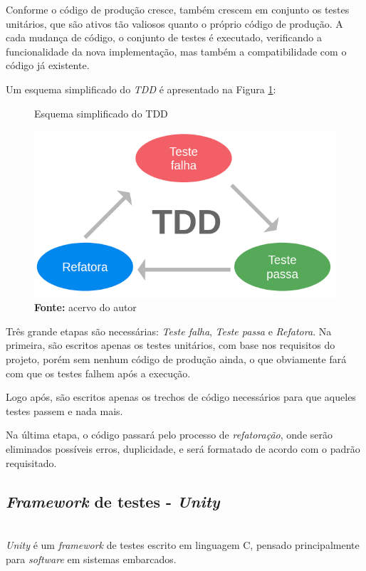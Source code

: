 \documentclass[times, twoside, watermark]{artigo}
\begin{document}
Conforme o código de produção cresce, também crescem em conjunto os testes unitários, 
que são ativos tão valiosos quanto o próprio código de produção. 
A cada mudança de código, o conjunto de testes é executado, verificando a 
funcionalidade da nova implementação, mas também a compatibilidade com o código já 
existente\cite{tddembeddedc}.

Um esquema simplificado do \textit{TDD} é apresentado na Figura \ref{fig:tdd}:\hfill\

\begin{figure}[H]
    \centering
    \caption{Esquema simplificado do TDD}
    \includegraphics[width=0.95\linewidth]{images/tdd.png}
    \caption*{\newline\textbf{Fonte:} acervo do autor}
    \label{fig:tdd}
\end{figure}

Três grande etapas são necessárias: \textit{Teste falha}, \textit{Teste passa}
e \textit{Refatora}. Na primeira, são escritos apenas os testes unitários, com base 
nos requisitos do projeto, porém sem nenhum código de produção ainda, o que 
obviamente fará com que os testes falhem após a execução.

Logo após, são escritos apenas os trechos de código necessários para que aqueles 
testes passem e nada mais.

Na última etapa, o código passará pelo processo de \textit{refatoração}, onde serão 
eliminados possíveis erros, duplicidade, e será formatado de acordo com o padrão 
requisitado.


\subsection{\textit{Framework} de testes - \textit{Unity}}\hfill\\

\textit{Unity} é um \textit{framework} de testes escrito em linguagem C, pensado 
principalmente para \textit{software} em sistemas embarcados.
\end{document}
